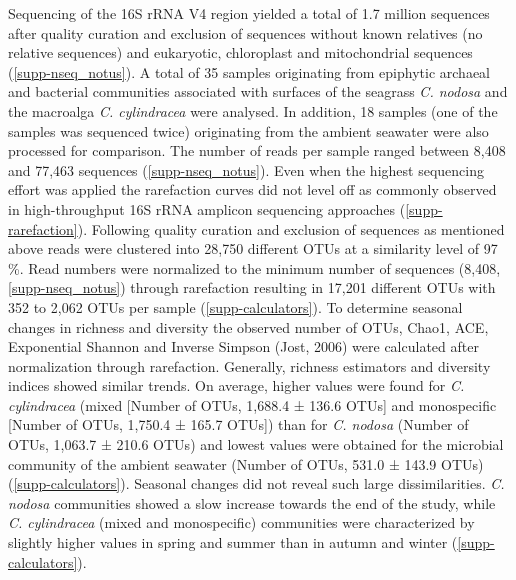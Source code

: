 \documentclass[
  12pt,
]{article}
\begin{document}
Sequencing of the 16S rRNA V4 region yielded a total of 1.7 million
sequences after quality curation and exclusion of sequences without
known relatives (no relative sequences) and eukaryotic, chloroplast and
mitochondrial sequences (\autoref{supp-nseq_notus}). A total of 35
samples originating from epiphytic archaeal and bacterial communities
associated with surfaces of the seagrass \emph{C. nodosa} and the
macroalga \emph{C. cylindracea} were analysed. In addition, 18 samples
(one of the samples was sequenced twice) originating from the ambient
seawater were also processed for comparison. The number of reads per
sample ranged between 8,408 and 77,463 sequences
(\autoref{supp-nseq_notus}). Even when the highest sequencing effort was
applied the rarefaction curves did not level off as commonly observed in
high-throughput 16S rRNA amplicon sequencing approaches
(\autoref{supp-rarefaction}). Following quality curation and exclusion
of sequences as mentioned above reads were clustered into 28,750
different OTUs at a similarity level of 97 \si{\percent}. Read numbers
were normalized to the minimum number of sequences (8,408,
\autoref{supp-nseq_notus}) through rarefaction resulting in 17,201
different OTUs with 352 to 2,062 OTUs per sample
(\autoref{supp-calculators}). To determine seasonal changes in richness
and diversity the observed number of OTUs, Chao1, ACE, Exponential
Shannon and Inverse Simpson (Jost, 2006) were calculated after
normalization through rarefaction. Generally, richness estimators and
diversity indices showed similar trends. On average, higher values were
found for \emph{C. cylindracea} (mixed {[}Number of OTUs, 1,688.4 ±
136.6 OTUs{]} and monospecific {[}Number of OTUs, 1,750.4 ± 165.7
OTUs{]}) than for \emph{C. nodosa} (Number of OTUs, 1,063.7 ± 210.6
OTUs) and lowest values were obtained for the microbial community of the
ambient seawater (Number of OTUs, 531.0 ± 143.9 OTUs)
(\autoref{supp-calculators}). Seasonal changes did not reveal such large
dissimilarities. \emph{C. nodosa} communities showed a slow increase
towards the end of the study, while \emph{C. cylindracea} (mixed and
monospecific) communities were characterized by slightly higher values
in spring and summer than in autumn and winter
(\autoref{supp-calculators}).
\end{document}
